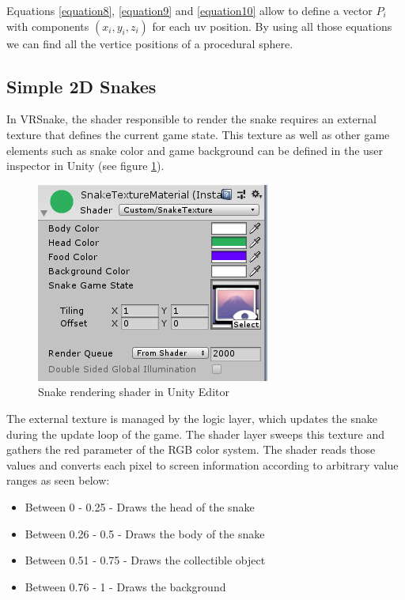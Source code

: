 \documentclass[runningheads]{llncs}
\begin{document}
Equations \ref{equation8}, \ref{equation9} and \ref{equation10} allow to define a vector $P_i$ with components $(x_i, y_i, z_i)$ for each uv position. By using all those equations we can find all the vertice positions of a procedural sphere.

\subsection{Simple 2D Snakes}
\label{subsec:2d-snakes}
In VRSnake, the shader responsible to render the snake requires an external texture that defines the current game state. This texture as well as other game elements such as snake color and game background can be defined in the user inspector in Unity (see figure \ref{fig:snake_editor_unity}).

\begin{figure}[!h]
    \centering
    \includegraphics[scale=1]{src/hci2020-images/SnakeTextureMaterial.png}
    \caption{Snake rendering shader in Unity Editor}
    \label{fig:snake_editor_unity}
\end{figure}

The external texture is managed by the logic layer, which updates the snake during the update loop of the game. The shader layer sweeps this texture and gathers the red parameter of the RGB color system. The shader reads those values and converts each pixel to screen information according to arbitrary value ranges as seen below:

\begin{itemize}
  \item Between 0 - 0.25 - Draws the head of the snake
  \item Between 0.26 - 0.5 - Draws the body of the snake
  \item Between 0.51 - 0.75 - Draws the collectible object
  \item Between 0.76 - 1 - Draws the background
\end{itemize}
\end{document}

